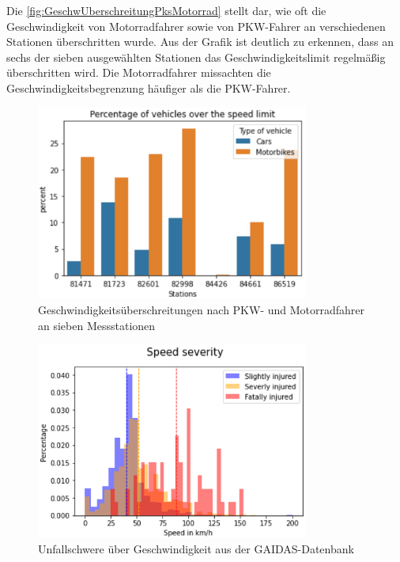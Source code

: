 Die \autoref{fig:GeschwUberschreitungPksMotorrad} stellt dar, wie oft die Geschwindigkeit von Motorradfahrer sowie von PKW-Fahrer an verschiedenen Stationen überschritten wurde. Aus der Grafik ist deutlich zu erkennen, dass an sechs der sieben ausgewählten Stationen das Geschwindigkeitslimit regelmäßig überschritten wird.
Die Motorradfahrer missachten die Geschwindigkeitsbegrenzung häufiger als die PKW-Fahrer. \citep{Maire2020}


\begin{figure}[htpb]
	\centering
	\includegraphics[width=0.8\textwidth]{Bilder/GeschwUberschreitungPksMotorrad.png}
	\caption{Geschwindigkeitsüberschreitungen nach PKW- und Motorradfahrer an sieben Messstationen\citep{Maire2020}}
	\label{fig:GeschwUberschreitungPksMotorrad}
\end{figure}
\begin{figure}[htpb]
	\centering
	\includegraphics[width=0.8\textwidth]{Bilder/SpeedSeverity.png}
	\caption{Unfallschwere über Geschwindigkeit aus der GAIDAS-Datenbank \citep{Maire2020}}
	\label{fig:SpeedSeverity}
\end{figure}
